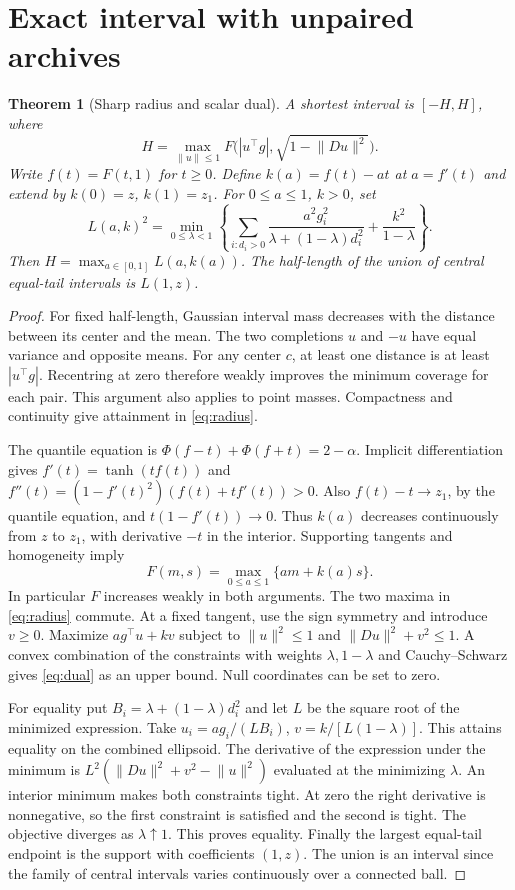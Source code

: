 \documentclass[11pt]{article}
\newtheorem{theorem}{Theorem}
\newcommand{\norm}[1]{\lVert #1\rVert}
\begin{document}


\section{Exact interval with unpaired archives}
\begin{theorem}[Sharp radius and scalar dual]\label{thm:sharp}
A shortest interval is $[-H,H]$, where
\begin{equation}
 H=\max_{\norm{u}\le1} F\bigl(|u^\top g|,\sqrt{1-\norm{Du}^2}\bigr).
 \label{eq:radius}
\end{equation}
Write $f(t)=F(t,1)$ for $t\ge0$. Define $k(a)=f(t)-at$ at $a=f'(t)$ and extend by $k(0)=z$, $k(1)=z_1$. For $0\le a\le1$, $k>0$, set
\begin{equation}
 L(a,k)^2=\min_{0\le\lambda<1}
 \left\{\sum_{i:d_i>0}\frac{a^2g_i^2}{\lambda+(1-\lambda)d_i^2}
              +\frac{k^2}{1-\lambda}\right\}.
 \label{eq:dual}
\end{equation}
Then $H=\max_{a\in[0,1]} L(a,k(a))$. The half-length of the union of central equal-tail intervals is $L(1,z)$.
\end{theorem}
\begin{proof}
For fixed half-length, Gaussian interval mass decreases with the distance between its center and the mean. The two completions $u$ and $-u$ have equal variance and opposite means. For any center $c$, at least one distance is at least $|u^\top g|$. Recentring at zero therefore weakly improves the minimum coverage for each pair. This argument also applies to point masses. Compactness and continuity give attainment in \eqref{eq:radius}.

The quantile equation is $\Phi(f-t)+\Phi(f+t)=2-\alpha$. Implicit differentiation gives $f'(t)=\tanh(tf(t))$ and $f''(t)=(1-f'(t)^2)(f(t)+tf'(t))>0$. Also $f(t)-t\to z_1$, by the quantile equation, and $t(1-f'(t))\to0$. Thus $k(a)$ decreases continuously from $z$ to $z_1$, with derivative $-t$ in the interior. Supporting tangents and homogeneity imply
\[
 F(m,s)=\max_{0\le a\le1}\{am+k(a)s\}.
\]
In particular $F$ increases weakly in both arguments. The two maxima in \eqref{eq:radius} commute. At a fixed tangent, use the sign symmetry and introduce $v\ge0$. Maximize $a g^\top u + kv$ subject to $\norm{u}^2\le1$ and $\norm{Du}^2+v^2\le1$. A convex combination of the constraints with weights $\lambda,1-\lambda$ and Cauchy--Schwarz gives \eqref{eq:dual} as an upper bound. Null coordinates can be set to zero.

For equality put $B_i=\lambda+(1-\lambda)d_i^2$ and let $L$ be the square root of the minimized expression. Take $u_i=ag_i/(LB_i)$, $v=k/[L(1-\lambda)]$. This attains equality on the combined ellipsoid. The derivative of the expression under the minimum is $L^2(\norm{Du}^2+v^2-\norm{u}^2)$ evaluated at the minimizing $\lambda$. An interior minimum makes both constraints tight. At zero the right derivative is nonnegative, so the first constraint is satisfied and the second is tight. The objective diverges as $\lambda\uparrow1$. This proves equality. Finally the largest equal-tail endpoint is the support with coefficients $(1,z)$. The union is an interval since the family of central intervals varies continuously over a connected ball.
\end{proof}
\end{document}
